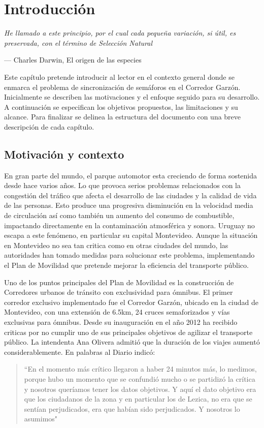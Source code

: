 \chapter{Introducción}
\epigraph{ \textit{He llamado a este principio, por el cual cada pequeña variación, si útil, es preservada, con el término de Selección Natural}}{--- Charles Darwin, El origen de las especies}

Este capítulo pretende introducir al lector en el contexto general donde se enmarca el problema de sincronización de semáforos en el Corredor Garzón. Inicialmente se describen las motivaciones y el enfoque seguido para su desarrollo. A continuación se especifican los objetivos propuestos, las limitaciones y su alcance. Para finalizar se delinea la estructura del documento con una breve descripción de cada capítulo. 

\section{Motivación y contexto}

En gran parte del mundo, el parque automotor esta creciendo de forma sostenida desde hace varios años. Lo que provoca serios problemas relacionados con la congestión del tráfico que afecta el desarrollo de las ciudades y la calidad de vida de las personas. Esto produce una progresiva disminución en la velocidad media de circulación así como también un aumento del consumo de combustible, impactando directamente en la contaminación atmosférica y sonora. Uruguay no escapa a este fenómeno, en particular su capital Montevideo. Aunque la situación en Montevideo no sea tan critica como en otras ciudades del mundo, las autoridades han tomado medidas para solucionar este problema, implementando el Plan de Movilidad que pretende mejorar la eficiencia del transporte público.

Uno de los puntos principales del Plan de Movilidad es la construcción de Corredores urbanos de tránsito con exclusividad para ómnibus. El primer corredor exclusivo implementado fue el Corredor Garzón, ubicado en la ciudad de Montevideo, con una extensión de 6.5km, 24 cruces semaforizados y vías exclusivas para ómnibus. Desde su inauguración en el año 2012 ha recibido criticas por no cumplir uno de sus principales objetivos de agilizar el transporte público. La intendenta Ana Olivera admitió que la duración de los viajes aumentó considerablemente. En palabras al Diario \cite{olivera2015} indicó: 


\begin{quote}\small
	``En el momento más crítico llegaron a haber 24 minutos más, lo medimos, porque hubo un momento que se confundió mucho o se partidizó la crítica y nosotros queríamos tener los datos objetivos. Y aquí el dato objetivo era que los ciudadanos de la zona y en particular los de Lezica, no era que se sentían perjudicados, era que habían sido perjudicados. Y nosotros lo asumimos"
\end{quote}

